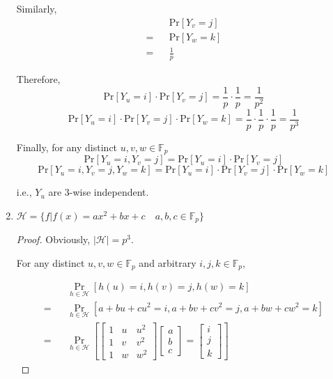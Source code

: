 \documentclass[12pt,a4]{article}
\newcounter{exercise}
\begin{document}
\begin{exercise}
\begin{enumerate}
			Similarly,
			\begin{eqnarray*}
				&&\text{Pr}[Y_v = j] \\
				= &&\text{Pr}[Y_w = k] \\
				= &&\frac{1}{p}
			\end{eqnarray*}
			
			Therefore,
			\[
				\text{Pr}[Y_u = i] \cdot \text{Pr}[Y_v = j] = \frac{1}{p} \cdot \frac{1}{p} = \frac{1}{p^2}
			\]
			\[
				\text{Pr}[Y_u = i] \cdot \text{Pr}[Y_v = j] \cdot \text{Pr}[Y_w = k] = \frac{1}{p} \cdot \frac{1}{p} \cdot \frac{1}{p} = \frac{1}{p^3}
			\]
			
			Finally, for any distinct $u, v, w \in \mathbb{F}_{p}$
			\[
				\text{Pr}[Y_u = i, Y_v = j] = \text{Pr}[Y_u = i] \cdot \text{Pr}[Y_v = j]
			\]
			\[
				\text{Pr}[Y_u = i, Y_v = j, Y_w = k] = \text{Pr}[Y_u = i] \cdot \text{Pr}[Y_v = j] \cdot \text{Pr}[Y_w = k]
			\]
			
			i.e., $Y_u$ are $3$-wise independent.
		\item
		
			$\mathcal{H} = \{ f | f(x) = a x^2 + b x + c \quad a,b,c \in \mathbb{F}_{p} \}$
			
			\begin{proof}
			
				Obviously, $|\mathcal{H}| = p^3$.
				
				For any distinct $u, v, w \in \mathbb{F}_{p}$ and arbitrary $i, j, k \in \mathbb{F}_{p}$,
				
				\begin{eqnarray*}
					&&\mathop{\text{Pr}} \limits_{h \in \mathcal{H}} [h(u) = i, h(v) = j, h(w) = k] \\
					= &&\mathop{\text{Pr}} \limits_{h \in \mathcal{H}} [a + bu + cu^2 = i, a + bv + cv^2 = j, a + bw + cw^2 = k] \\
					= &&\mathop{\text{Pr}} \limits_{h \in \mathcal{H}}[
					\left[
					\begin{matrix}
						1 & u & u^2 \\
						1 & v & v^2 \\
						1 & w & w^2
					\end{matrix}
					\right]
					\left[
					\begin{matrix}
						a \\
						b \\
						c
					\end{matrix}
					\right]
					=
					\left[
					\begin{matrix}
						i \\
						j \\
						k
					\end{matrix}
					\right]
					]
				\end{eqnarray*}
				

\end{proof}
\end{enumerate}
\end{exercise}
\end{document}
